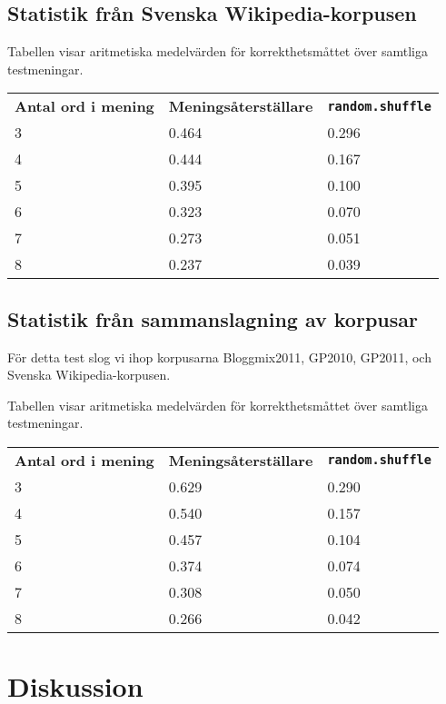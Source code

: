 \documentclass[a4paper,11pt]{article}
\begin{document}
\subsection*{Statistik från Svenska Wikipedia-korpusen}

Tabellen visar aritmetiska medelvärden för korrekthetsmåttet över samtliga testmeningar.
\begin{center}
\begin{tabular}{l l l}
\textbf{Antal ord i mening} & \textbf{Meningsåterställare} & \textbf{\texttt{random.shuffle}}\\
3 & 0.464 & 0.296\\
4 & 0.444 & 0.167\\
5 & 0.395 & 0.100\\
6 & 0.323 & 0.070\\
7 & 0.273 & 0.051\\
8 & 0.237 & 0.039\\
\end{tabular}
\end{center}

\subsection*{Statistik från sammanslagning av korpusar}

För detta test slog vi ihop korpusarna Bloggmix2011, GP2010, GP2011, och Svenska
Wikipedia-korpusen.

\vspace{0.25cm}
\noindent
Tabellen visar aritmetiska medelvärden för korrekthetsmåttet över samtliga testmeningar.
\begin{center}
\begin{tabular}{l l l}
\textbf{Antal ord i mening} & \textbf{Meningsåterställare} & \textbf{\texttt{random.shuffle}}\\
3 & 0.629 & 0.290\\
4 & 0.540 & 0.157\\
5 & 0.457 & 0.104\\
6 & 0.374 & 0.074\\
7 & 0.308 & 0.050\\
8 & 0.266 & 0.042\\
\end{tabular}
\end{center}

\section*{Diskussion}
\end{document}
